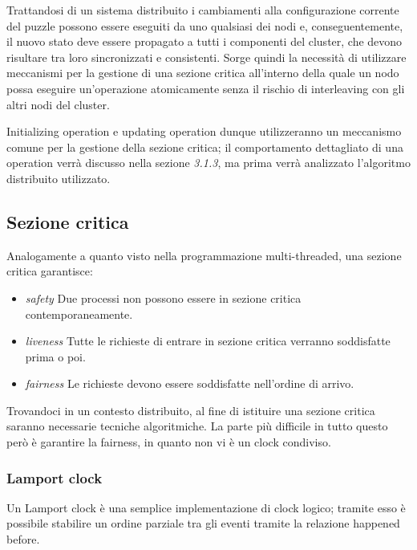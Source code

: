 \noindent Trattandosi di un sistema distribuito i cambiamenti alla configurazione corrente del puzzle possono essere eseguiti da uno qualsiasi dei nodi e, conseguentemente, il nuovo stato deve essere propagato a tutti i componenti del cluster, che devono risultare tra loro sincronizzati e consistenti.\newline
\noindent Sorge quindi la necessità di utilizzare meccanismi per la gestione di una sezione critica all'interno della quale un nodo possa eseguire un'operazione atomicamente senza il rischio di interleaving con gli altri nodi del cluster.\newline

\noindent Initializing operation e updating operation dunque utilizzeranno un meccanismo comune per la gestione della sezione critica; il comportamento dettagliato di una operation verrà discusso nella sezione \textit{3.1.3}, ma prima verrà analizzato l'algoritmo distribuito utilizzato.

\subsection{Sezione critica}\label{sezioneCriticaAkka}
Analogamente a quanto visto nella programmazione multi-threaded, una sezione critica garantisce:
\begin{itemize}
    \item \textit{safety} \newline
    Due processi non possono essere in sezione critica contemporaneamente.
    \item \textit{liveness} \newline
    Tutte le richieste di entrare in sezione critica verranno soddisfatte prima o poi.
    \item \textit{fairness} \newline
    Le richieste devono essere soddisfatte nell'ordine di arrivo.
\end{itemize}
Trovandoci in un contesto distribuito, al fine di istituire una sezione critica saranno necessarie tecniche algoritmiche. La parte più difficile in tutto questo però è garantire la fairness, in quanto non vi è un clock condiviso.
\subsubsection{Lamport clock}
Un Lamport clock è una semplice implementazione di clock logico; tramite esso è possibile stabilire un ordine parziale tra gli eventi tramite la relazione happened before.\newline

